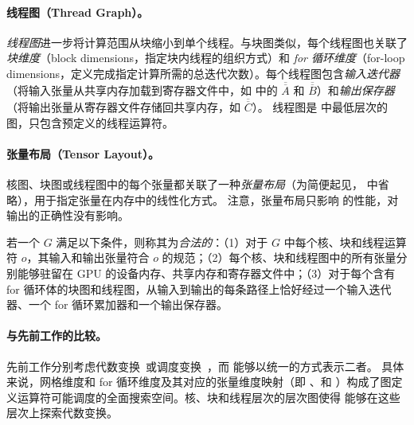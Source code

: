 \paragraph{线程图（Thread Graph）。}{\em 线程图}进一步将计算范围从块缩小到单个线程。与块图类似，每个线程图也关联了{\em 块维度}（block dimensions，指定块内线程的组织方式）和 {\em for 循环维度}（for-loop dimensions，定义完成指定计算所需的总迭代次数）。每个线程图包含{\em 输入迭代器}（将输入张量从共享内存加载到寄存器文件中，如  中的 $\overline{\overline{A}}$ 和 $\overline{\overline{B}}$）和{\em 输出保存器}（将输出张量从寄存器文件存储回共享内存，如 $\overline{\overline{C}}$）。
线程图是 \graph 中最低层次的图，只包含预定义的线程运算符。

\paragraph{张量布局（Tensor Layout）。}核图、块图或线程图中的每个张量都关联了一种{\em 张量布局}（为简便起见， 中省略），用于指定张量在内存中的线性化方式。
注意，张量布局只影响 \graph 的性能，对输出的正确性没有影响。

\begin{definition}
若一个 \graph $G$ 满足以下条件，则称其为{\em 合法的}：（1）对于 $G$ 中每个核、块和线程运算符 $o$，其输入和输出张量符合 $o$ 的规范；（2）每个核、块和线程图中的所有张量分别能够驻留在 GPU 的设备内存、共享内存和寄存器文件中；（3）对于每个含有 for 循环体的块图和线程图，从输入到输出的每条路径上恰好经过一个输入迭代器、一个 for 循环累加器和一个输出保存器。
\end{definition}

\paragraph{与先前工作的比较。}
先前工作分别考虑代数变换~\cite{TASO, wang2021pet}或调度变换~\cite{halide, tvm, autohalide}，而 \graphs 能够以统一的方式表示二者。
具体来说，网格维度和 for 循环维度及其对应的张量维度映射（即 \imap、\omap 和 \fmap）构成了图定义运算符可能调度的全面搜索空间。核、块和线程层次的层次图使得 \sys 能够在这些层次上探索代数变换。
